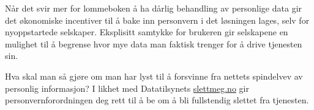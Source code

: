 \documentclass[12pt,a4paper, norsk]{article}
\begin{document}
Når det svir mer for lommeboken å ha dårlig behandling av personlige data gir det økonomiske
incentiver til å bake inn personvern i det løsningen lages, selv for nyoppstartede
selskaper. Eksplisitt samtykke for brukeren gir selskapene en mulighet til å
begrense hvor mye data man faktisk trenger for å drive tjenesten sin. 

Hva skal man så gjøre om man har lyst til å forsvinne fra nettets spindelvev av personlig
informasjon? I likhet med Datatilsynets \url{slettmeg.no} gir personvernforordningen deg
rett til å be om å bli fullstendig slettet fra tjenesten.



\printbibliography[heading=bibintoc, title={Litteraturliste}]
\end{document}
